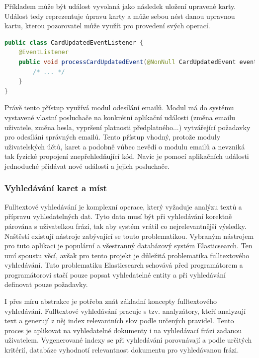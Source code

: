 		Příkladem může být událost vyvolaná jako následek uložení upravené karty.
		Událost tedy reprezentuje úpravu karty a může sebou nést danou upravnou kartu, kterou pozorovatel může
		využít pro provedení svých operací.

		\begin{lstlisting}[language=Java, caption={Ukázka pozorovatele vystavených aplikačních událostí. Zdroj: [autor]}]
public class CardUpdatedEventListener {
    @EventListener
    public void processCardUpdatedEvent(@NonNull CardUpdatedEvent event) {
        /* ... */
    }
}
		\end{lstlisting}

		Právě tento přístup využívá modul odesílání emailů.
		Modul má do systému vystavené vlastní posluchače na konkrétní aplikační události (změna emailu uživatele, změna hesla,
		vypršení platnosti předplatného...) vytvářející požadavky pro odesílání správných emailů.
		Tento přístup vhodný, protože moduly uživatelských účtů, karet a podobně vůbec nevědí o modulu emailů a nevzniká
		tak fyzické propojení znepřehledňující kód.
		Navíc je pomocí aplikačních události jednoduché přidávat nové události a jejich posluchače.

		\subsubsection{Vyhledávání karet a míst}

		Fulltextové vyhledávání je komplexní operace, který vyžaduje analýzu textů a přípravu vyhledatelných dat.
		Tyto data musí být při vyhledávání korektně párována s uživatelkou frází, tak aby systém vrátil co nejrelevantnější
		výsledky.
		Naštěstí existují nástroje zabývající se touto problematikou.
		Vybraným nástrojem pro tuto aplikaci je populární a všestranný databázový systém Elasticsearch.
		Ten umí spoustu věcí, avšak pro tento projekt je důležitá problematika fulltextového vyhledávání.
		Tuto problematiku Elasticsearch schovává před programátorem a programátorovi stačí pouze popsat
		vyhledatelné entity a při vyhledávání definovat pouze požadavky.

		I přes míru abstrakce je potřeba znát základní koncepty fulltextového vyhledávání.
		Fulltextové vyhledávání pracuje s tzv. analyzátory, kteří analyzují text a generují z něj index relevantních
		slov podle určených pravidel.
		Tento proces je aplikovat na vyhledatelné dokumenty i na vyhledávací frázi zadanou uživatelem.
		Vygenerované indexy se při vyhledávání porovnávají a podle určitých kritérií, databáze vyhodnotí relevantnost
		dokumentu pro vyhledávanou frázi. \cite{index_search_analysis}

